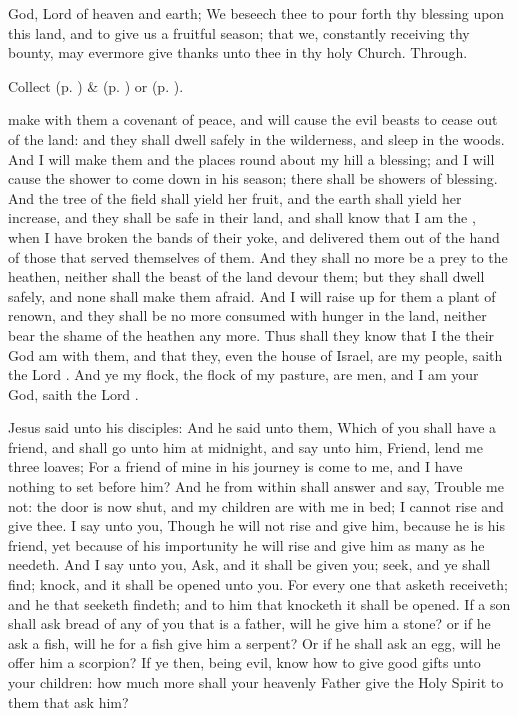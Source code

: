 \collect
{} God, Lord of heaven and earth; We beseech thee to pour forth thy blessing upon this land, and to give us a fruitful season; that we, constantly receiving thy bounty, may evermore give thanks unto thee in thy holy Church. Through.
\begin{rubric}
     Collect  (p. \pageref{SPMaryInEaster}) \&   (p. \pageref{SPAgainst}) or  (p. \pageref{SPChiefBishop}).
\end{rubric}

 make with them a covenant of peace, and will cause the evil beasts to cease out of the land: and they shall dwell safely in the wilderness, and sleep in the woods. And I will make them and the places round about my hill a blessing; and I will cause the shower to come down in his season; there shall be showers of blessing. And the tree of the field shall yield her fruit, and the earth shall yield her increase, and they shall be safe in their land, and shall know that I am the , when I have broken the bands of their yoke, and delivered them out of the hand of those that served themselves of them. And they shall no more be a prey to the heathen, neither shall the beast of the land devour them; but they shall dwell safely, and none shall make them afraid. And I will raise up for them a plant of renown, and they shall be no more consumed with hunger in the land, neither bear the shame of the heathen any more. Thus shall they know that I the  their God am with them, and that they, even the house of Israel, are my people, saith the Lord . And ye my flock, the flock of my pasture, are men, and I am your God, saith the Lord .


 Jesus said unto his disciples: And he said unto them, Which of you shall have a friend, and shall go unto him at midnight, and say unto him, Friend, lend me three loaves; For a friend of mine in his journey is come to me, and I have nothing to set before him? And he from within shall answer and say, Trouble me not: the door is now shut, and my children are with me in bed; I cannot rise and give thee. I say unto you, Though he will not rise and give him, because he is his friend, yet because of his importunity he will rise and give him as many as he needeth. And I say unto you, Ask, and it shall be given you; seek, and ye shall find; knock, and it shall be opened unto you. For every one that asketh receiveth; and he that seeketh findeth; and to him that knocketh it shall be opened. If a son shall ask bread of any of you that is a father, will he give him a stone? or if he ask a fish, will he for a fish give him a serpent? Or if he shall ask an egg, will he offer him a scorpion? If ye then, being evil, know how to give good gifts unto your children: how much more shall your heavenly Father give the Holy Spirit to them that ask him?

